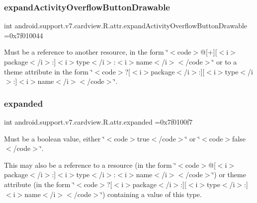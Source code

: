 \subsubsection{\texorpdfstring{expand\+Activity\+Overflow\+Button\+Drawable}{expandActivityOverflowButtonDrawable}}
{\footnotesize\ttfamily int android.\+support.\+v7.\+cardview.\+R.\+attr.\+expand\+Activity\+Overflow\+Button\+Drawable =0x7f010044\hspace{0.3cm}{\ttfamily [static]}}

Must be a reference to another resource, in the form \char`\"{}$<$code$>$@\mbox{[}+\mbox{]}\mbox{[}$<$i$>$package$<$/i$>$\+:\mbox{]}$<$i$>$type$<$/i$>$\+:$<$i$>$name$<$/i$>$$<$/code$>$\char`\"{} or to a theme attribute in the form \char`\"{}$<$code$>$?\mbox{[}$<$i$>$package$<$/i$>$\+:\mbox{]}\mbox{[}$<$i$>$type$<$/i$>$\+:\mbox{]}$<$i$>$name$<$/i$>$$<$/code$>$\char`\"{}. \mbox{\label{classandroid_1_1support_1_1v7_1_1cardview_1_1R_1_1attr_a648bc14af4dface51acb88262207eebc}} 
\subsubsection{\texorpdfstring{expanded}{expanded}}
{\footnotesize\ttfamily int android.\+support.\+v7.\+cardview.\+R.\+attr.\+expanded =0x7f0100f7\hspace{0.3cm}{\ttfamily [static]}}

Must be a boolean value, either \char`\"{}$<$code$>$true$<$/code$>$\char`\"{} or \char`\"{}$<$code$>$false$<$/code$>$\char`\"{}. 

This may also be a reference to a resource (in the form \char`\"{}$<$code$>$@\mbox{[}$<$i$>$package$<$/i$>$\+:\mbox{]}$<$i$>$type$<$/i$>$\+:$<$i$>$name$<$/i$>$$<$/code$>$\char`\"{}) or theme attribute (in the form \char`\"{}$<$code$>$?\mbox{[}$<$i$>$package$<$/i$>$\+:\mbox{]}\mbox{[}$<$i$>$type$<$/i$>$\+:\mbox{]}$<$i$>$name$<$/i$>$$<$/code$>$\char`\"{}) containing a value of this type. \mbox{\label{classandroid_1_1support_1_1v7_1_1cardview_1_1R_1_1attr_a068c1520150b812c70b2fb76a8fe73ae}} 
